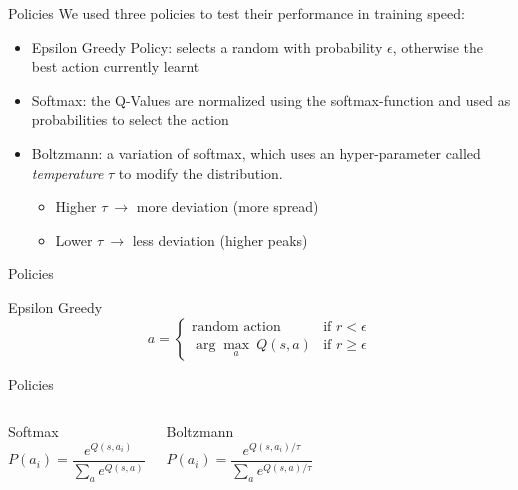 \documentclass[10pt, xcolor={dvipsnames}]{beamer}
\begin{document}
\begin{frame}{Policies}
    We used three policies to test their performance in training speed:
    \begin{itemize}
        \item \alert{Epsilon Greedy Policy}: selects a random with probability $\epsilon$, otherwise the best action currently learnt
        \item \alert{Softmax}: the Q-Values are normalized using the softmax-function and used as probabilities to select the action
        \item \alert{Boltzmann}: a variation of softmax, which uses an hyper-parameter called \textit{temperature} $\tau$ to modify the distribution. 
        \begin{itemize}
            \item Higher $\tau \ \to$ more deviation (more spread)
            \item Lower $\tau \ \to$ less deviation (higher peaks)
        \end{itemize}
    \end{itemize}
\end{frame}

\begin{frame}{Policies}
    \begin{block}{\centering Epsilon Greedy}
    \centering
    \resizebox{0.5\textwidth}{!}{}
    \[a = \begin{cases}
            \text{random action} & \text{if  } r < \epsilon  \\
            \arg\max_a \ Q(s, a) & \text{if  } r \geq \epsilon
           \end{cases}
    \]
    \end{block}
\end{frame}

\begin{frame}{Policies}
    \begin{columns}
        \begin{block}{\centering Softmax}
        \centering
        \resizebox{0.9\textwidth}{!}{}
        \[ P(a_i) = \frac{e^{Q(s, a_i)}}{\sum_a e^{Q(s, a)}}\]
        \end{block}
        
        \begin{block}{\centering Boltzmann}
        \centering
        \resizebox{1\textwidth}{!}{}
        \[ P(a_i) = \frac{e^{Q(s, a_i) / \tau}}{\sum_a e^{Q(s, a)/\tau}}\]
        \end{block}
    \end{columns}    
\end{frame}
\end{document}
